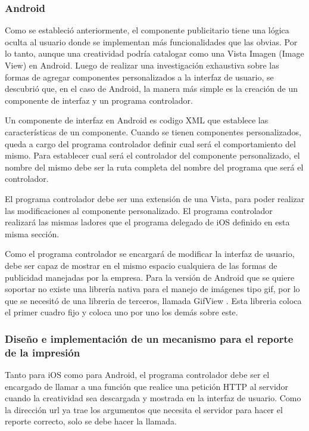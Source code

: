 \subsubsection*{Android}

Como se estableció anteriormente, el componente publicitario tiene
una lógica oculta al usuario donde se implementan más funcionalidades
que las obvias. Por lo tanto, aunque una creatividad podría catalogar
como una Vista Imagen (Image View) en Android. Luego de realizar una
investigación exhaustiva sobre las formas de agregar componentes personalizados
a la interfaz de usuario, se descubrió que, en el caso de Android,
la manera más simple es la creación de un componente de interfaz y
un programa controlador.

Un componente de interfaz en Android es codigo XML que establece las
características de un componente. Cuando se tienen componentes personalizados,
queda a cargo del programa controlador definir cual será el comportamiento
del mismo. Para establecer cual será el controlador del componente
personalizado, el nombre del mismo debe ser la ruta completa del nombre
del programa que será el controlador.

El programa controlador debe ser una extensión de una Vista, para
poder realizar las modificaciones al componente personalizado. El
programa controlador realizará las mismas ladores que el programa
delegado de iOS definido en esta misma sección.

Como el programa controlador se encargará de modificar la interfaz
de usuario, debe ser capaz de mostrar en el mismo espacio cualquiera
de las formas de publicidad manejadas por la empresa. Para la versión
de Android que se quiere soportar no existe una librería nativa para
el manejo de imágenes tipo gif, por lo que se necesitó de una libreria
de terceros, llamada GifView \cite{Cap5.GifView}. Esta libreria coloca
el primer cuadro fijo y coloca uno por uno los demás sobre este.


\subsubsection{Diseño e implementación de un mecanismo para el reporte de la impresión}

Tanto para iOS como para Android, el programa controlador debe ser
el encargado de llamar a una función que realice una petición HTTP
al servidor cuando la creatividad sea descargada y mostrada en la
interfaz de usuario. Como la dirección url ya trae los argumentos
que necesita el servidor para hacer el reporte correcto, solo se debe
hacer la llamada.


